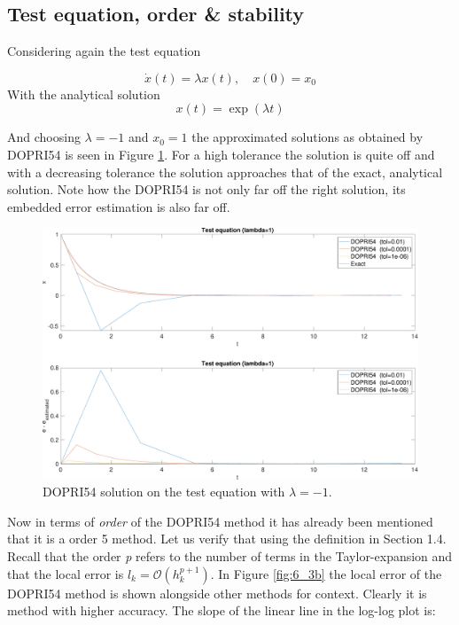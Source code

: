 \subsection{Test equation, order \& stability}
Considering again the test equation

$$
\dot{x}(t)=\lambda x(t), \quad x(0)=x_{0} \label{eq:test}
$$
With the analytical solution
$$
x(t) = \exp(\lambda t)
$$

And choosing $\lambda=-1$ and $x_{0}=1$ the approximated solutions as obtained by DOPRI54 is seen in Figure \ref{fig:6_3}. For a high tolerance the solution is quite off and with a decreasing tolerance the solution approaches that of the exact, analytical solution. Note how the DOPRI54 is not only far off the right solution, its embedded error estimation is also far off.\\

\begin{figure}[h]
    \centering
    \includegraphics[width=\textwidth]{plots/6_3a.pdf}
    \caption{DOPRI54 solution on the test equation with $\lambda=-1$.}
    \label{fig:6_3}
\end{figure}

Now in terms of \textit{order} of the DOPRI54 method it has already been mentioned that it is a order 5 method. Let us verify that using the definition in Section 1.4. Recall that the order \textit{p} refers to the number of terms in the Taylor-expansion and that the local error is $l_{k}=\mathcal{O}\left(h_{k}^{p+1}\right)$. In Figure \ref{fig:6_3b} the local error of the DOPRI54 method is shown alongside other methods for context. Clearly it is method with higher accuracy. The slope of the linear line in the log-log plot is:

